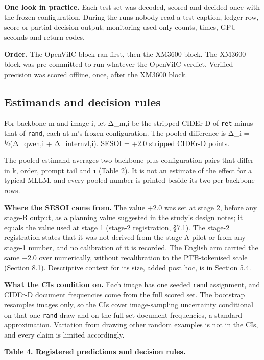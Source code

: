 \documentclass[manuscript,screen]{acmart}
\begin{document}
\textbf{One look in practice.} Each test set was decoded, scored and decided once with the frozen
configuration. During the runs nobody read a test caption, ledger row, score or partial decision
output; monitoring used only counts, times, GPU seconds and return codes.

\textbf{Order.} The OpenViIC block ran first, then the XM3600 block. The XM3600 block was
pre-committed to run whatever the OpenViIC verdict. Verified precision was scored offline, once,
after the XM3600 block.

\subsection{Estimands and decision rules}\label{estimands-and-decision-rules}

For backbone m and image i, let Δ\_m,i be the stripped CIDEr-D of \texttt{ret} minus that of
\texttt{rand}, each at m's frozen configuration. The pooled difference is Δ\_i = ½(Δ\_qwen,i +
Δ\_internvl,i). SESOI = +2.0 stripped CIDEr-D points.

The pooled estimand averages two backbone-plus-configuration pairs that differ in k, order, prompt
tail and τ (Table 2). It is not an estimate of the effect for a typical MLLM, and every pooled
number is printed beside its two per-backbone rows.

\textbf{Where the SESOI came from.} The value +2.0 was set at stage 2, before any stage-B output, as
a planning value suggested in the study's design notes; it equals the value used at stage 1 (stage-2
registration, §7.1). The stage-2 registration states that it was not derived from the stage-A pilot
or from any stage-1 number, and no calibration of it is recorded. The English arm carried the same
+2.0 over numerically, without recalibration to the PTB-tokenised scale (Section 8.1). Descriptive
context for its size, added post hoc, is in Section 5.4.

\textbf{What the CIs condition on.} Each image has one seeded \texttt{rand} assignment, and CIDEr-D
document frequencies come from the full scored set. The bootstrap resamples images only, so the CIs
cover image-sampling uncertainty conditional on that one \texttt{rand} draw and on the full-set
document frequencies, a standard approximation. Variation from drawing other random examples is not
in the CIs, and every claim is limited accordingly.

\textbf{Table 4. Registered predictions and decision rules.}
\end{document}

